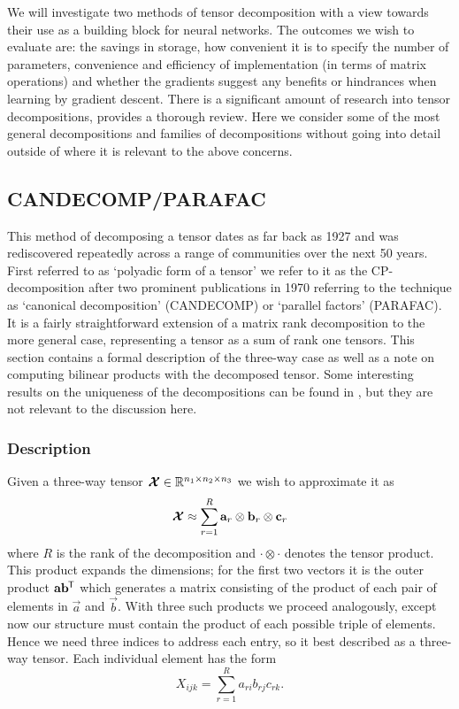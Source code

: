 We will investigate two methods of tensor decomposition with a view towards their use as a building
block for neural networks. The outcomes we wish to evaluate are: the savings in storage, how
convenient it is to specify the number of parameters, convenience and efficiency of implementation
(in terms of matrix operations) and whether the gradients suggest any benefits or hindrances when
learning by gradient descent. There is a significant amount of research into tensor decompositions,
\autocite{Kolda2009} provides a thorough review. Here we consider some of the most general
decompositions and families of decompositions without going into detail outside of where it is
relevant to the above concerns.

\subsection{CANDECOMP/PARAFAC}
This method of decomposing a tensor dates as far back as 1927 
\autocite{Hitchcock1927, Hitchcock1928} and was rediscovered repeatedly across a range of
communities over the next 50 years. \autocite{Kolda2009} First referred to as `polyadic
form of a tensor' we refer to it as the CP-decomposition after two prominent publications in
1970 referring to the technique as `canonical decomposition' (CANDECOMP) \autocite{Carroll1970}
 or `parallel factors' (PARAFAC). \autocite{Harshman1970}
 It is a fairly straightforward
extension of a matrix rank decomposition to the more general case, representing a tensor as
a sum of rank one tensors. This section contains a formal description of the three-way case
as well as a note on computing bilinear products with the decomposed tensor.
Some interesting results on the uniqueness of the decompositions can be found in \autocite{Kolda2009},
but they are not relevant to the discussion here.

\subsubsection{Description}
Given a three-way tensor \(\bm{\mathcal{X}} \in \mathbb{R}^{n_1 \times n_2 \times n_3}\) we wish to 
approximate it as
\begin{equation}\label{eq:cp-statement}
	\bm{\mathcal{X}} \approx \sum_{r=1}^{R} \mathbf{a}_r \otimes \mathbf{b}_r \otimes \mathbf{c}_r
\end{equation}
 where \(R\) is the rank of the decomposition and \(\cdot \otimes \cdot\) denotes the tensor
product. This product expands the dimensions; for the first two vectors it is the outer product
\(\mathbf{a}\mathbf{b}^{\mkern-1.5mu\mathsf{T}}\) which generates a matrix consisting of the product of each pair of
elements in \(\vec{a}\) and \(\vec{b}\). With three such products we proceed analogously, except
now our structure must contain the product of each possible triple of elements. Hence we need
three indices to address each entry, so it best described as a three-way tensor. Each individual
element has the form
\begin{equation}\label{eq:cp-element}
	X_{ijk} = \sum_{r=1}^R a_{ri}b_{rj}c_{rk}.
\end{equation}

